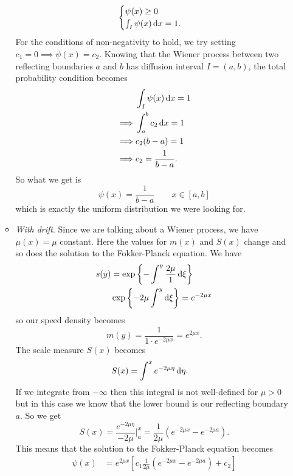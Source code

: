 \documentclass[12pt]{article}
\begin{document}
\begin{enumerate}
\begin{itemize}
\begin{equation*}
\begin{cases}
					\psi(x)\geq0\\
					\int_{I}\psi(x)\mathop{}\!\mathrm{d} x=1.
				\end{cases}
			\end{equation*}
		For the conditions of non-negativity to hold, we try setting $c_{1}=0\implies\psi(x)=c_{2}$.
		Knowing that the Wiener process between two reflecting boundaries $a$ and $b$ has diffusion interval $I=(a,b)$, the total probability condition becomes
		\begin{align*}
			&\int_{I}\psi(x)\mathop{}\!\mathrm{d} x=1\\
			\implies&\int_{a}^{b}c_{2}\mathop{}\!\mathrm{d} x=1\\
			\implies&c_{2}(b-a)=1\\
			\implies& c_{2}=\frac{1}{b-a}.
		\end{align*}
		So what we get is 
		\begin{equation*}
			\psi(x)=\frac{1}{b-a}\qquad x\in[a,b]
		\end{equation*}
		which is exactly the uniform distribution we were looking for.
		\item \emph{With drift}. Since we are talking about a Wiener process, we have $\mu(x)=\mu$ constant. Here the values for $m(x)$ and $S(x)$ change and so does the solution to the Fokker-Planck equation. We have
		\begin{align*}
			s(y)&=\exp\left\{-\int^{y}\frac{2\mu}{1}\mathop{}\!\mathrm{d}\xi\right\}\\
			&\exp\left\{-2\mu\int^{y}\mathop{}\!\mathrm{d}\xi\right\}=e^{-2\mu x}
		\end{align*}
		so our speed density becomes
		\begin{equation*}
			m(y)=\frac{1}{1\cdot e^{-2\mu x}}=e^{2\mu x}.
		\end{equation*}
		The scale measure $S(x)$ becomes
		\begin{align*}
			S(x)&=\int^{x}e^{-2\mu\eta}\mathop{}\!\mathrm{d}\eta.
		\end{align*}
		If we integrate from $-\infty$ then this integral is not well-defined for $\mu>0$ but in this case we know that the lower bound is our reflecting boundary $a$. So we get
		\begin{equation*}
			S(x)=\frac{e^{-2\mu\eta}}{-2\mu}\bigg|_{a}^{x}=\frac{1}{2\mu}\left(e^{-2\mu x}-e^{-2\mu a}\right).
		\end{equation*}
		This means that the solution to the Fokker-Planck equation becomes
		\begin{align*}
			\psi(x)&=e^{2\mu x}\left[c_{1}\frac{1}{2\mu}\left(e^{-2\mu x}-e^{-2\mu a}\right)+c_{2}\right]\\

\end{align*}
\end{itemize}
\end{enumerate}
\end{document}
